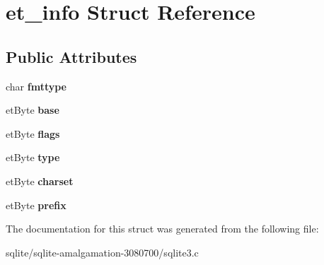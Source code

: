 \hypertarget{structet__info}{\section{et\+\_\+info Struct Reference}
\label{structet__info}
}
\subsection*{Public Attributes}
\begin{DoxyCompactItemize}
\item 
\hypertarget{structet__info_a1740af27f0c9d5840e7dda59a129aa4b}{char {\bfseries fmttype}}\label{structet__info_a1740af27f0c9d5840e7dda59a129aa4b}

\item 
\hypertarget{structet__info_a20f5a4c11c7aa1d9c777805d11965c66}{et\+Byte {\bfseries base}}\label{structet__info_a20f5a4c11c7aa1d9c777805d11965c66}

\item 
\hypertarget{structet__info_a8f11646aaec803f0870683dc3ba2f756}{et\+Byte {\bfseries flags}}\label{structet__info_a8f11646aaec803f0870683dc3ba2f756}

\item 
\hypertarget{structet__info_a148bd1efa49018c9a723701ba5747825}{et\+Byte {\bfseries type}}\label{structet__info_a148bd1efa49018c9a723701ba5747825}

\item 
\hypertarget{structet__info_a77131acb7479b0e6aad61af0901e11c2}{et\+Byte {\bfseries charset}}\label{structet__info_a77131acb7479b0e6aad61af0901e11c2}

\item 
\hypertarget{structet__info_a23cc866bf202c34e49bd49599b051628}{et\+Byte {\bfseries prefix}}\label{structet__info_a23cc866bf202c34e49bd49599b051628}

\end{DoxyCompactItemize}


The documentation for this struct was generated from the following file\+:\begin{DoxyCompactItemize}
\item 
sqlite/sqlite-\/amalgamation-\/3080700/sqlite3.\+c\end{DoxyCompactItemize}
